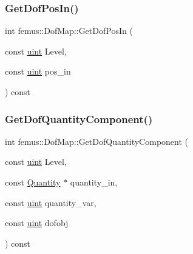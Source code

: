 \subsubsection{\texorpdfstring{Get\+Dof\+Pos\+In()}{GetDofPosIn()}}
{\footnotesize\ttfamily int femus\+::\+Dof\+Map\+::\+Get\+Dof\+Pos\+In (\begin{DoxyParamCaption}\item[{const \mbox{\hyperlink{_typedefs_8hpp_a91ad9478d81a7aaf2593e8d9c3d06a14}{uint}}}]{Level,  }\item[{const \mbox{\hyperlink{_typedefs_8hpp_a91ad9478d81a7aaf2593e8d9c3d06a14}{uint}}}]{pos\+\_\+in }\end{DoxyParamCaption}) const\hspace{0.3cm}{\ttfamily [inline]}}

\mbox{\label{classfemus_1_1_dof_map_a5a09306eb3fff3f5b831ee7044903e59}} 
\subsubsection{\texorpdfstring{Get\+Dof\+Quantity\+Component()}{GetDofQuantityComponent()}}
{\footnotesize\ttfamily int femus\+::\+Dof\+Map\+::\+Get\+Dof\+Quantity\+Component (\begin{DoxyParamCaption}\item[{const \mbox{\hyperlink{_typedefs_8hpp_a91ad9478d81a7aaf2593e8d9c3d06a14}{uint}}}]{Level,  }\item[{const \mbox{\hyperlink{classfemus_1_1_quantity}{Quantity}} $\ast$}]{quantity\+\_\+in,  }\item[{const \mbox{\hyperlink{_typedefs_8hpp_a91ad9478d81a7aaf2593e8d9c3d06a14}{uint}}}]{quantity\+\_\+var,  }\item[{const \mbox{\hyperlink{_typedefs_8hpp_a91ad9478d81a7aaf2593e8d9c3d06a14}{uint}}}]{dofobj }\end{DoxyParamCaption}) const}

\mbox{\label{classfemus_1_1_dof_map_ad772757cab6d2c551e614a1aa5987349}} 
